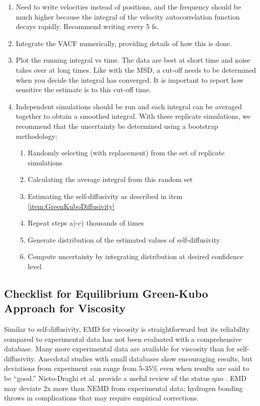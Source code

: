 \documentclass[9pt]{livecoms}
\begin{document}
\begin{enumerate}
	\item Need to write velocities instead of positions, and the frequency should be much higher because the integral of the velocity autocorrelation function decays rapidly. Recommend writing every 5 fs. 
	\item Integrate the VACF numerically, providing details of how this is done.
	\item Plot the running integral vs time. The data are best at short time and noise takes over at long times. Like with the MSD, a cut-off needs to be determined when you decide the integral has converged. It is important to report how sensitive the estimate is to this cut-off time. \label{item:GreenKuboDiffusivity}
	\item Independent simulations should be run and each integral can be averaged together to obtain a smoothed integral. With these replicate simulations, we recommend that the uncertainty be determined using a bootstrap methodology:
	\begin{enumerate}
		\item Randomly selecting (with replacement) from the set of replicate simulations
		\item Calculating the average integral from this random set
		\item Estimating the self-diffusivity as described in item \ref{item:GreenKuboDiffusivity}
		\item Repeat steps a)-c) thousands of times
		\item Generate distribution of the estimated values of self-diffusivity 
		\item Compute uncertainty by integrating distribution at desired confidence level
	\end{enumerate}
\end{enumerate}

\subsection{Checklist for Equilibrium Green-Kubo Approach for Viscosity}

Similar to self-diffusivity, EMD for viscosity is straightforward but its reliability compared to experimental data has not been evaluated with a comprehensive database. Many more experimental data are available for viscosity than for self-diffusivity. Anecdotal studies with small databases show encouraging results, but deviations from experiment can range from 5-35\% even when results are said to be “good.” Nieto-Draghi et al. provide a useful review of the status quo \cite{Nieto2015}. EMD may deviate 2x more than NEMD from experimental data; hydrogen bonding throws in complications that may require empirical corrections. 
\end{document}
